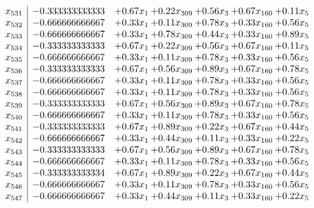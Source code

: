 \documentclass[8pt]{article}
\begin{document}
\[\begin{array}{c| c c@{\hskip 2pt} c@{\hskip 2pt} c@{\hskip 2pt} c@{\hskip 2pt} c@{\hskip 2pt} }
 x_{531}   &  -0.333333333333 & +  0.67 x_{1} & +  0.22 x_{309} & +  0.56 x_{3} & +  0.67 x_{160} & +  0.11 x_{5}\\
 x_{532}   &  -0.666666666667 & +  0.33 x_{1} & +  0.11 x_{309} & +  0.78 x_{3} & +  0.33 x_{160} & +  0.56 x_{5}\\
 x_{533}   &  -0.666666666667 & +  0.33 x_{1} & +  0.78 x_{309} & +  0.44 x_{3} & +  0.33 x_{160} & +  0.89 x_{5}\\
 x_{534}   &  -0.333333333333 & +  0.67 x_{1} & +  0.22 x_{309} & +  0.56 x_{3} & +  0.67 x_{160} & +  0.11 x_{5}\\
 x_{535}   &  -0.666666666667 & +  0.33 x_{1} & +  0.11 x_{309} & +  0.78 x_{3} & +  0.33 x_{160} & +  0.56 x_{5}\\
 x_{536}   &  -0.333333333333 & +  0.67 x_{1} & +  0.56 x_{309} & +  0.89 x_{3} & +  0.67 x_{160} & +  0.78 x_{5}\\
 x_{537}   &  -0.666666666667 & +  0.33 x_{1} & +  0.11 x_{309} & +  0.78 x_{3} & +  0.33 x_{160} & +  0.56 x_{5}\\
 x_{538}   &  -0.666666666667 & +  0.33 x_{1} & +  0.11 x_{309} & +  0.78 x_{3} & +  0.33 x_{160} & +  0.56 x_{5}\\
 x_{539}   &  -0.333333333333 & +  0.67 x_{1} & +  0.56 x_{309} & +  0.89 x_{3} & +  0.67 x_{160} & +  0.78 x_{5}\\
 x_{540}   &  -0.666666666667 & +  0.33 x_{1} & +  0.11 x_{309} & +  0.78 x_{3} & +  0.33 x_{160} & +  0.56 x_{5}\\
 x_{541}   &  -0.333333333333 & +  0.67 x_{1} & +  0.89 x_{309} & +  0.22 x_{3} & +  0.67 x_{160} & +  0.44 x_{5}\\
 x_{542}   &  -0.666666666667 & +  0.33 x_{1} & +  0.44 x_{309} & +  0.11 x_{3} & +  0.33 x_{160} & +  0.22 x_{5}\\
 x_{543}   &  -0.333333333333 & +  0.67 x_{1} & +  0.56 x_{309} & +  0.89 x_{3} & +  0.67 x_{160} & +  0.78 x_{5}\\
 x_{544}   &  -0.666666666667 & +  0.33 x_{1} & +  0.11 x_{309} & +  0.78 x_{3} & +  0.33 x_{160} & +  0.56 x_{5}\\
 x_{545}   &  -0.333333333334 & +  0.67 x_{1} & +  0.89 x_{309} & +  0.22 x_{3} & +  0.67 x_{160} & +  0.44 x_{5}\\
 x_{546}   &  -0.666666666667 & +  0.33 x_{1} & +  0.11 x_{309} & +  0.78 x_{3} & +  0.33 x_{160} & +  0.56 x_{5}\\
 x_{547}   &  -0.666666666667 & +  0.33 x_{1} & +  0.44 x_{309} & +  0.11 x_{3} & +  0.33 x_{160} & +  0.22 x_{5}\\

\end{array}\]
\end{document}
